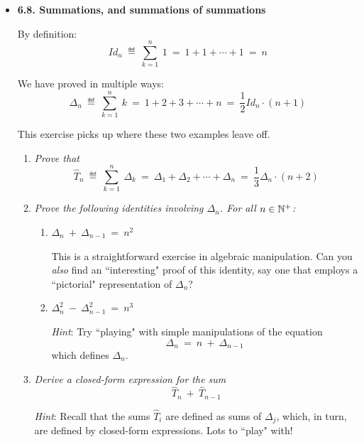 \begin{itemize}
\item
{\bf 6.8. Summations, and summations of summations}
\smallskip

By definition:
\[ Id_n \ \eqdef \ \sum_{k=1}^n \ 1 \ = \ 1 + 1 + \cdots +1 \  = \ n \]

We have proved in multiple ways:
\[ \Delta_n \ \eqdef \  \sum_{k=1}^n \ k \ = \ 1+2+3+ \cdots +n \ = \ \frac{1}{2} Id_n \cdot (n+1) \]

\smallskip

This exercise picks up where these two examples leave off.

  \begin{enumerate}
  \item 
{\em Prove that}
\[ \widehat{T}_n \ \eqdef \  \sum_{k=1}^n \ \Delta_k \ = \   
\Delta_1 + \Delta_2 + \cdots + \Delta_n \ = \ \frac{1}{3} \Delta_n \cdot (n+2) \]


  \item
{\em Prove the following identities involving $\Delta_n$.  For all $n \in \mathbb{N}^+$:}
    \begin{enumerate}
    \item
$\Delta_n \ + \ \Delta_{n-1} \ = \ n^2$

\smallskip

This is a straightforward exercise in algebraic manipulation.  Can you {\em also} find an ``interesting" proof of this identity, say one that employs a ``pictorial" representation of $\Delta_n$?

 \item
$\Delta_n^2 \ - \ \Delta_{n-1}^2 \ = \ n^3$

\smallskip

{\em Hint}: Try ``playing" with simple manipulations of the equation 
\[ \Delta_n \ = \ n \ + \ \Delta_{n-1} \]
which defines $\Delta_n$.
   \end{enumerate}

  \item
{\em Derive a closed-form expression for the sum}
\[ \widehat{T}_n \ + \ \widehat{T} _{n-1} \]

\smallskip

{\em Hint}: Recall that the sums $\widehat{T}_i$ are defined as sums of $\Delta_j$, which, in turn, are defined by closed-form expressions.  Lots to ``play" with!
\end{enumerate}
\end{itemize} 


